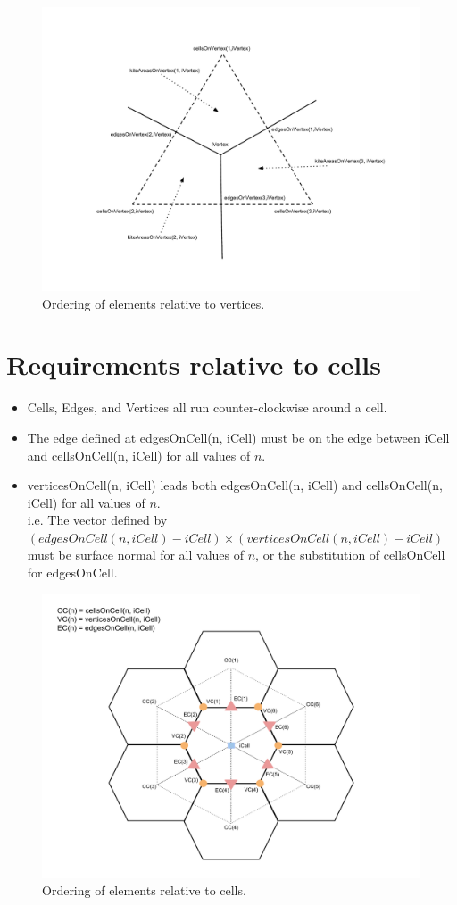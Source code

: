 \documentclass[11pt]{report}
\begin{document}
\begin{figure}
	\centering
	\includegraphics[scale=0.4]{figures/Vertex Diagram.pdf}
	\caption{Ordering of elements relative to vertices.}
\end{figure}

\section{Requirements relative to cells}

\begin{itemize}
	\item Cells, Edges, and Vertices all run counter-clockwise around a cell.
	\item The edge defined at edgesOnCell(n, iCell) must be on the edge between iCell and cellsOnCell(n, iCell) for all values of $n$.
	\item verticesOnCell(n, iCell) leads both edgesOnCell(n, iCell) and cellsOnCell(n, iCell) for all values of $n$. \\
		  i.e. The vector defined by \\
		  {\small $(edgesOnCell(n, iCell) - iCell) \times (verticesOnCell(n, iCell) - iCell)$} \\
		  must be surface normal for all values of $n$, or the substitution of cellsOnCell for edgesOnCell.
\end{itemize}

\begin{figure}
	\centering
	\includegraphics[scale=0.4]{figures/Cell Diagram.pdf}
	\caption{Ordering of elements relative to cells.}
\end{figure}
\end{document}
